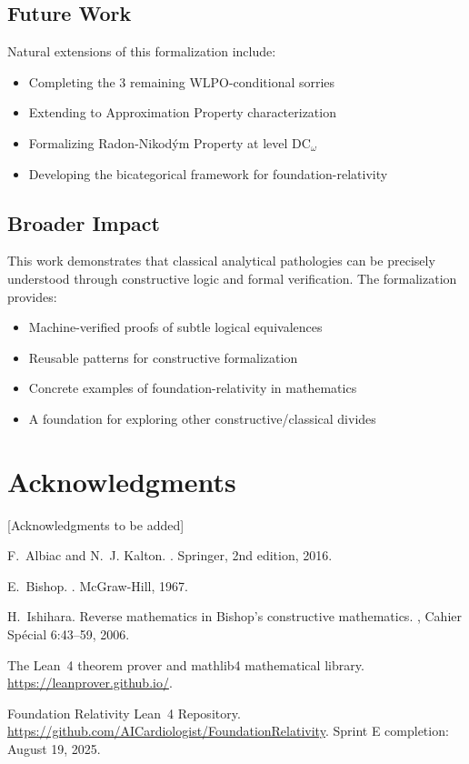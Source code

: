 \documentclass{lmcs}
\begin{document}
\subsection{Future Work}

Natural extensions of this formalization include:
\begin{itemize}
\item Completing the 3 remaining WLPO-conditional sorries
\item Extending to Approximation Property characterization
\item Formalizing Radon-Nikodým Property at level $\mathrm{DC}_\omega$
\item Developing the bicategorical framework for foundation-relativity
\end{itemize}

\subsection{Broader Impact}

This work demonstrates that classical analytical pathologies can be precisely understood through constructive logic and formal verification. The formalization provides:
\begin{itemize}
\item Machine-verified proofs of subtle logical equivalences
\item Reusable patterns for constructive formalization
\item Concrete examples of foundation-relativity in mathematics
\item A foundation for exploring other constructive/classical divides
\end{itemize}

\section*{Acknowledgments}

[Acknowledgments to be added]


\begin{thebibliography}{10}

F.~Albiac and N.~J. Kalton.
.
\newblock Springer, 2nd edition, 2016.

E.~Bishop.
.
\newblock McGraw-Hill, 1967.

H.~Ishihara.
\newblock Reverse mathematics in Bishop's constructive mathematics.
, Cahier Spécial 6:43--59, 2006.

The Lean~4 theorem prover and mathlib4 mathematical library.
\newblock \url{https://leanprover.github.io/}.

Foundation Relativity Lean~4 Repository.
\newblock \url{https://github.com/AICardiologist/FoundationRelativity}.
\newblock Sprint E completion: August 19, 2025.

\end{thebibliography}
\end{document}
